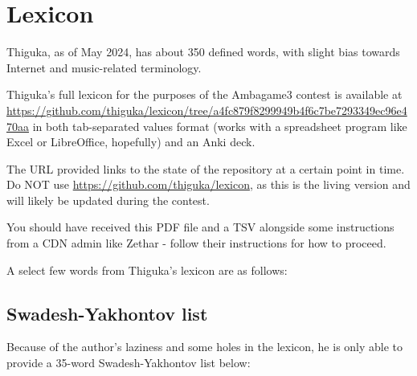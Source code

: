 
\newpage
\section{Lexicon}
Thiguka, as of May 2024, has about 350 defined words, with slight bias towards Internet and music-related terminology.

Thiguka's full lexicon for the purposes of the Ambagame3 contest is available at \url{https://github.com/thiguka/lexicon/tree/a4fc879f8299949b4f6c7be7293349ec96e470aa} in both tab-separated values format (works with a spreadsheet program like Excel or LibreOffice, hopefully) and an Anki deck.

The URL provided links to the state of the repository at a certain point in time. Do NOT use \url{https://github.com/thiguka/lexicon}, as this is the living version and will likely be updated during the contest.

You should have received this PDF file and a TSV alongside some instructions from a CDN admin like Zethar - follow their instructions for how to proceed.

A select few words from Thiguka's lexicon are as follows:

\subsection{Swadesh-Yakhontov list}
Because of the author's laziness and some holes in the lexicon, he is only able to provide a 35-word Swadesh-Yakhontov list below:

